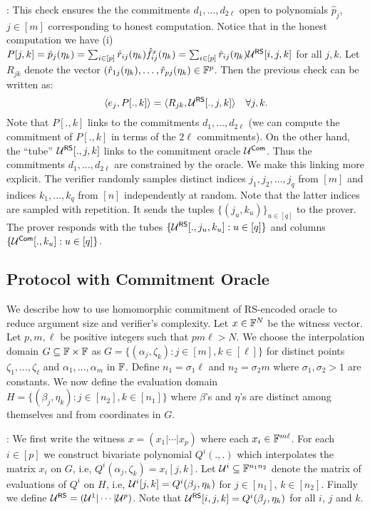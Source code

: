 : This check ensures
the the commitments $d_1,\ldots,d_{2\ell}$ open to polynomials $\hat{p}_j$,
$j\in [m]$ corresponding to honest computation. Notice that in the honest
computation we have (i) $P[j,k]=\hat{p}_j(\eta_k)=\sum_{i\in
[p]}\hat{r}_{ij}(\eta_k)\hat{f}^x_{ij}(\eta_k)=\sum_{i\in[p]}\hat{r}_{ij}(\eta_k)\mathcal{U}^{\mathsf{RS}}[i,j,k]$
for all $j,k$. Let $R_{jk}$ denote the vector
$(\hat{r}_{1j}(\eta_k),\ldots,\hat{r}_{pj}(\eta_k)\in \mathbb{F}^p$. Then the previous
check can be written as:
\begin{equation}
\langle e_j,P[.,k]\rangle = \langle R_{jk},\mathcal{U}^{\mathsf{RS}}[.,j,k]\rangle \quad \forall j,k.
\end{equation}
Note that $P[.,k]$ links to the commitments $d_1,\ldots,d_{2\ell}$ (we can
compute the commitment of $P[.,k]$ in terms of the $2\ell$ commitments). On the
other hand, the ``tube'' $\mathcal{U}^{\mathsf{RS}}[.,j,k]$ links to the commitment oracle
$\mathcal{U}^{\mathsf{Com}}$. Thus the commitments $d_1,\ldots,d_{2\ell}$ are constrained by
the oracle. We make this linking more explicit. The verifier randomly samples
distinct indices $j_1,j_2,\ldots,j_q$ from $[m]$ and indices $k_1,\ldots,k_q$
from $[n]$ independently at random. Note that the latter indices are sampled
with repetition. It sends the tuples $\{(j_u,k_u)\}_{u\in [q]}$ to the prover. The prover responds with the tubes
$\{\mathcal{U}^{\mathsf{RS}}[.,j_u,k_u]:u\in [q]\}$ and columns $\{\mathcal{U}^{\mathsf{Com}}[.,k_u]:u\in
[q]\}$. 
  

\subsection{Protocol with Commitment Oracle}
We describe how to use homomorphic commitment of RS-encoded oracle to reduce
argument size and verifier's complexity. Let $x\in \mathbb{F}^N$ be the witness
vector. Let $p,m,\ell$ be positive integers such that $pm\ell > N$. We choose the interpolation domain $G\subseteq \mathbb{F}\times \mathbb{F}$ as
$G=\{(\alpha_j,\zeta_k): j\in [m], k\in [\ell]\}$ for distinct points
$\zeta_1,\ldots,\zeta_\ell$ and $\alpha_1,\ldots,\alpha_m$ in $\mathbb{F}$. Define $n_1=\sigma_1\ell$ and
$n_2=\sigma_2 m$ where $\sigma_1,\sigma_2 > 1$ are constants. We now define the
evaluation domain $H=\{(\beta_j,\eta_k): j\in [n_2],k\in
[n_1]\}$ where $\beta$'s and $\eta$'s are distinct among themselves and from
coordinates in $G$.\smallskip

:
We first write the witness $x=(x_1|\cdots|x_p)$ where each $x_i\in
\mathbb{F}^{m\ell}$.
For each $i\in [p]$ we construct bivariate polynomial $Q^i(.,.)$ which
interpolates the matrix $x_i$ on $G$, i.e, $Q^i(\alpha_j,\zeta_k)=x_i[j,k]$.
Let $\mathcal{U}^i\subseteq \mathbb{F}^{n_1n_2}$ denote the matrix of evaluations of $Q^i$
on $H$, i.e, $\mathcal{U}^i[j,k]=Q^i(\beta_j,\eta_k)$ for $j\in [n_1]$, $k\in
[n_2]$. Finally we define $\mathcal{U}^{\mathsf{RS}}=(\mathcal{U}^1|\cdots|\mathcal{U}^p)$. Note that
$\mathcal{U}^{\mathsf{RS}}[i,j,k]=Q^i(\beta_j,\eta_k)$ for all $i$, $j$ and $k$.\smallskip

